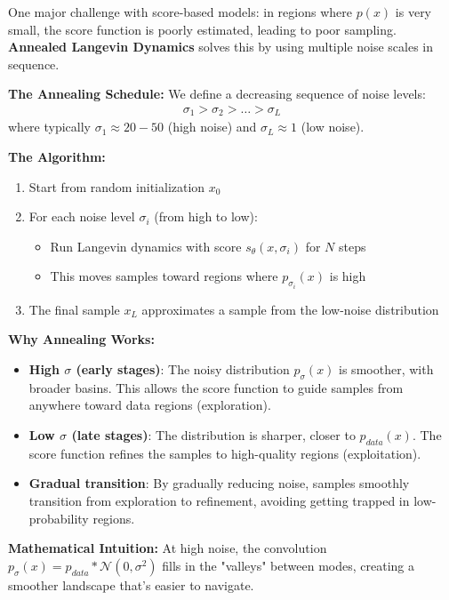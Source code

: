 \documentclass[journal]{IEEEtran}
\begin{document}
One major challenge with score-based models: in regions where $p(x)$ is very small, the score function is poorly estimated, leading to poor sampling. \textbf{Annealed Langevin Dynamics} solves this by using multiple noise scales in sequence.

\textbf{The Annealing Schedule:} We define a decreasing sequence of noise levels:
\begin{align}
\sigma_1 > \sigma_2 > \ldots > \sigma_L
\end{align}
where typically $\sigma_1 \approx 20-50$ (high noise) and $\sigma_L \approx 1$ (low noise).

\textbf{The Algorithm:}
\begin{enumerate}
    \item Start from random initialization $x_0$
    \item For each noise level $\sigma_i$ (from high to low):
    \begin{itemize}
        \item Run Langevin dynamics with score $s_\theta(x, \sigma_i)$ for $N$ steps
        \item This moves samples toward regions where $p_{\sigma_i}(x)$ is high
    \end{itemize}
    \item The final sample $x_L$ approximates a sample from the low-noise distribution
\end{enumerate}

\textbf{Why Annealing Works:}
\begin{itemize}
    \item \textbf{High $\sigma$ (early stages)}: The noisy distribution $p_\sigma(x)$ is smoother, with broader basins. This allows the score function to guide samples from anywhere toward data regions (exploration).
    
    \item \textbf{Low $\sigma$ (late stages)}: The distribution is sharper, closer to $p_{data}(x)$. The score function refines the samples to high-quality regions (exploitation).
    
    \item \textbf{Gradual transition}: By gradually reducing noise, samples smoothly transition from exploration to refinement, avoiding getting trapped in low-probability regions.
\end{itemize}

\textbf{Mathematical Intuition:} At high noise, the convolution $p_\sigma(x) = p_{data} * \mathcal{N}(0, \sigma^2)$ fills in the "valleys" between modes, creating a smoother landscape that's easier to navigate.
\end{document}
